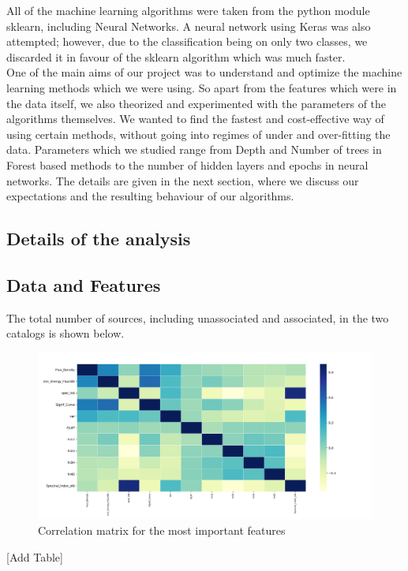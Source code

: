  All of the machine learning algorithms were taken from the python module sklearn, including Neural Networks. A neural network using Keras was also attempted; however, due to the classification being on only two classes, we discarded it in favour of the sklearn algorithm which was much faster.\\
One of the main aims of our project was to understand and optimize the machine learning methods which we were using. So apart from the features which were in the data itself, we also theorized and experimented with the parameters of the algorithms themselves. We wanted to find the fastest and cost-effective way of using certain methods, without going into regimes of under and over-fitting the data. Parameters which we studied range from Depth and Number of trees in Forest based methods to the number of hidden layers and epochs in neural networks. The details are given in the next section, where we discuss our expectations and the resulting behaviour of our algorithms.\\	




\subsection{Details of the analysis}

\subsection{Data and Features}

The total number of sources, including unassociated and associated, in the two catalogs is shown below. \\
\begin{figure}[h]
\includegraphics[width=\onepic\textwidth]{plots/correlation.pdf}
\caption{Correlation matrix for the most important features}
\label{fig:corr}
\end{figure}
[Add Table]\\

